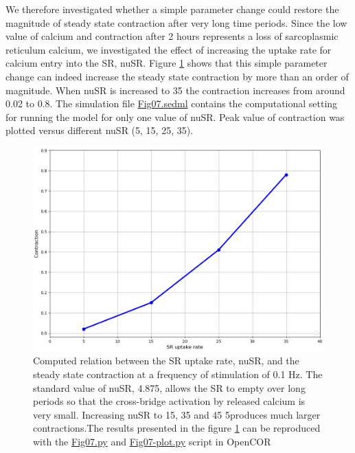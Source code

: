 \documentclass[fleqn,10pt]{physiome}
\begin{document}
We therefore investigated whether a simple parameter change could restore the magnitude of steady state contraction after very long time periods. Since the low value of calcium and contraction after 2 hours represents a loss of sarcoplasmic reticulum calcium, we investigated the effect of increasing the uptake rate for calcium entry into the SR, nuSR. Figure \ref{fig07} shows that this simple parameter change can indeed increase the steady state contraction by more than an order of magnitude. When nuSR is increased to 35 the contraction increases from around 0.02 to 0.8. The simulation file \href{https://models.physiomeproject.org/workspace/5c6/file/afd4d5cb20ecdcbc0b10198fe31795520488a34e/Fig07.sedml}{Fig07.sedml} contains the computational setting for running the model for only one value of nuSR. Peak value of contraction was plotted versus different nuSR (5, 15, 25, 35).\newline

\begin{figure}[h!]
\centering
\includegraphics[width=0.8\linewidth]{fig07}
\caption{Computed relation between the SR uptake rate, nuSR, and the steady state contraction at a frequency of stimulation of 0.1 Hz. The standard value of nuSR, 4.875, allows the SR to empty over long periods so that the cross-bridge activation by released calcium is very small. Increasing nuSR to 15, 35 and 45 5produces much larger contractions.The results presented in the figure \ref{fig07} can be reproduced with the \href{https://models.physiomeproject.org/workspace/5c6/file/afd4d5cb20ecdcbc0b10198fe31795520488a34e/Fig07.py}{Fig07.py} and \href{https://models.physiomeproject.org/workspace/5c6/file/afd4d5cb20ecdcbc0b10198fe31795520488a34e/Fig07-plot.py}{Fig07-plot.py} script in OpenCOR} 
\label{fig07}
\end{figure}
\end{document}
